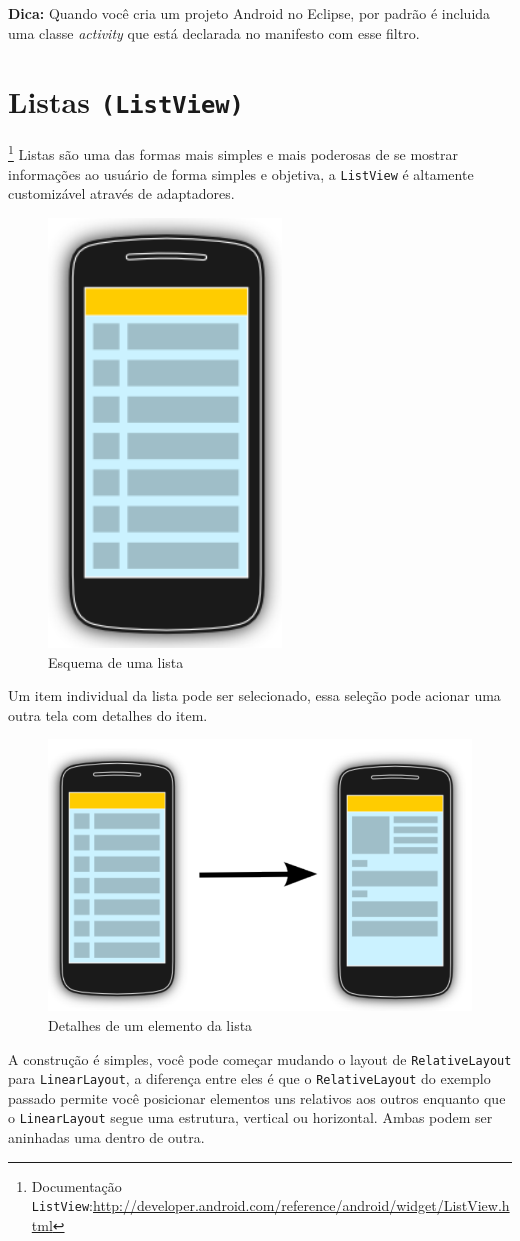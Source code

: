 \documentclass[a4paper,12pt,brazil,doubleside]{book}
\begin{document}
\begin{singlespace}
\begin{framed}
\textbf{Dica:} Quando você cria um projeto Android no Eclipse, por padrão é incluida uma classe \emph{activity} que está declarada no manifesto com esse filtro.
\end{framed}


\section{Listas \texttt{(ListView)}}\footnote{Documentação \texttt{ListView}:\href{http://developer.android.com/reference/android/widget/ListView.html}{http://developer.android.com/reference/android/widget/ListView.html}}
Listas são uma das formas mais simples e mais poderosas de se mostrar informações ao usuário de forma simples e objetiva, a \texttt{ListView} é altamente customizável através de adaptadores.

\begin{figure}[H]
  \centering
  \includegraphics[width=.15\textwidth]{figuras/design/listview-scheme.png}
  \caption{Esquema de uma lista}
  \label{fig:e}
\end{figure}

Um item individual da lista pode ser selecionado, essa seleção pode acionar uma outra tela com detalhes do item.


\begin{figure}[H]
  \centering
  \includegraphics[width=.35\textwidth]{figuras/design/listview-scheme2.png}
  \caption{Detalhes de um elemento da lista}
  \label{fig:e}
\end{figure}

\newpage

A construção é simples, você pode começar mudando o layout de \texttt{RelativeLayout} para \texttt{LinearLayout}, a diferença entre eles é que o \texttt{RelativeLayout} do exemplo passado permite você posicionar elementos uns relativos aos outros enquanto que o \texttt{LinearLayout} segue uma estrutura, vertical ou horizontal. Ambas podem ser aninhadas uma dentro de outra.


\end{singlespace}
\end{document}
